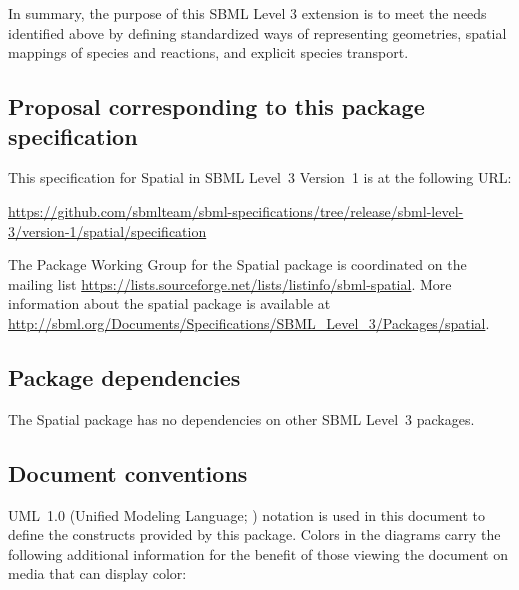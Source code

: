 In summary, the purpose of this SBML Level 3 extension is to meet the needs identified above by defining standardized ways of representing geometries, spatial mappings of species and reactions, and explicit species transport.


\pagebreak

\subsection{Proposal corresponding to this package specification}

This specification for Spatial in SBML Level~3 Version~1 is  at the following URL:

\begin{center}
  \vspace*{1ex}\small
  \footnotesize{\url{https://github.com/sbmlteam/sbml-specifications/tree/release/sbml-level-3/version-1/spatial/specification}}
  \vspace*{1ex}
\end{center}

The Package Working Group for the Spatial package is coordinated on the mailing list \url{https://lists.sourceforge.net/lists/listinfo/sbml-spatial}.  More information about the spatial package is available at \url{http://sbml.org/Documents/Specifications/SBML_Level_3/Packages/spatial}.

\subsection{Package dependencies}

The Spatial package has no dependencies on other SBML Level~3 packages.


\subsection{Document conventions}
\label{conventions}

UML~1.0 (Unified Modeling Language; \citealt{eriksson:1998, oestereich:1999}) notation is used in this document to define the constructs provided by this package.  Colors in the diagrams carry the following additional information for the benefit of those viewing the document on media that can display color:


